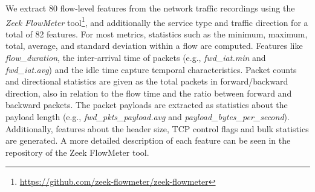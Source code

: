 We extract 80 flow-level features from the network traffic recordings using the \emph{Zeek FlowMeter} tool\footnote{\url{https://github.com/zeek-flowmeter/zeek-flowmeter}}, and additionally the service type and traffic direction for a total of 82 features. For most metrics, statistics such as the minimum, maximum, total, average, and standard deviation within a flow are computed. Features like \emph{flow\_duration}, the inter-arrival time of packets (e.g., \emph{fwd\_iat.min} and \emph{fwd\_iat.avg}) and the idle time capture temporal characteristics. Packet counts and directional statistics are given as the total packets in forward/backward direction, also in relation to the flow time and the ratio between forward and backward packets. The packet payloads are extracted as statistics about the payload length (e.g., \emph{fwd\_pkts\_payload.avg} and \emph{payload\_bytes\_per\_second}). Additionally, features about the header size, TCP control flags and bulk statistics are generated.
A more detailed description of each feature can be seen in the repository of the Zeek FlowMeter tool.
